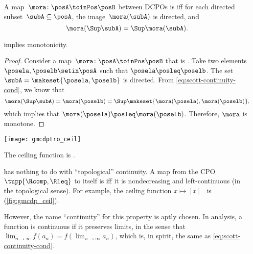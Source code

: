 \begin{definition}[\scottcontinuity]
    \label{def:scott}
    A map~$\mora\colon\posA\toinPos\posB$ between DCPOs is \emph{\scottcontinuous{}} iff for each directed subset~$\subA\subseteq\posA$, the image~$\mora(\subA)$ is directed, and
    \begin{equation}\label{eq:scott-continuity-cond}
        \mora(\Sup \subA)=\Sup \mora(\subA).
    \end{equation}
\end{definition}
\begin{lemma}
    \scottcontinuity implies monotonicity.
\end{lemma}
\begin{proof}
    Consider a map~$\mora\colon\posA\toinPos\posB$ that is \scottcontinuous.
    Take two elements $\posela, \poselb \setin \posA$ such that $\posela\posleq\poselb$.
    The set $ \subA =  \makeset{\posela, \poselb}$ is directed.
    From \cref{eq:scott-continuity-cond}, we know that
    \begin{equation}
        \mora(\Sup \subA) = \mora(\poselb) = \Sup \makeset{\mora(\posela), \mora(\poselb)},
    \end{equation}
    which implies that $\mora(\posela) \posleq \mora(\poselb)$.
    Therefore, $\mora$ is monotone.
\end{proof}

\begin{marginfigure}
    \texttt{[image: gmcdptro\_ceil]}
    \caption{The ceiling function is \scottcontinuous.}
    \label{fig:gmcdp_ceil}
\end{marginfigure}

\begin{remark}
    \scottcontinuity has nothing to do with ``topological'' continuity.
    A map from the CPO $\tupp{\Rcomp,\Rleq}$ to itself is \scottcontinuous iff it is nondecreasing and left-continuous (in the topological sense).
    For example, the ceiling function $x\mapsto\left\lceil x\right\rceil $~ is \scottcontinuous (\cref{fig:gmcdp_ceil}).

    However, the name ``continuity'' for this property is aptly chosen.
    In analysis, a function is continuous if it preserves limits,
    in the sense that $\lim_{n\to\infty}f(a_n) = f(\lim_{n\to\infty}a_n)$, which is, in spirit, the same as
    \cref{eq:scott-continuity-cond}.
\end{remark}


